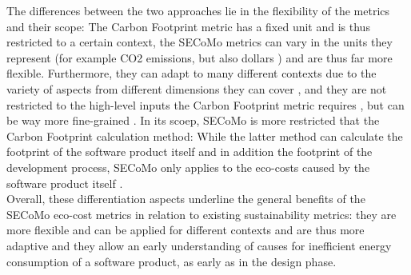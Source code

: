 \documentclass[oribibl]{llncs}
\begin{document}
The differences between the two approaches lie in the flexibility of the metrics and their scope: The Carbon Footprint metric has a fixed unit and is thus restricted to a certain context, the SECoMo metrics can vary in the units they represent (for example CO2 %
emissions, but also dollars \cite{schulze_cost_2016}) and are thus far more flexible. Furthermore, they can adapt to many different contexts due to the variety of aspects from different dimensions they can cover \cite{schulze_cost_2016}, and they are not restricted to the high-level inputs the Carbon Footprint metric requires \cite{kern_impacts_2015}, but can be way more fine-grained \cite{schulze_cost_2016}. In its scoep, SECoMo is more restricted that the Carbon Footprint calculation method: While the latter method can calculate the footprint of the software product itself and in addition the footprint of the development process\cite{kern_impacts_2015}, SECoMo only applies to the eco-costs caused by the software product itself \cite{schulze_cost_2016}. 
\\ Overall, these differentiation aspects underline the general benefits of the SECoMo eco-cost metrics in relation to existing sustainability metrics: they are more flexible and can be applied for different contexts and are  thus more adaptive and they allow an early understanding of causes for inefficient energy consumption of a software product, as early as in the design phase. %
\end{document}

